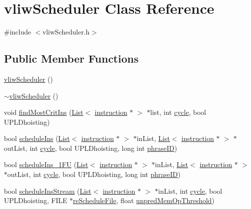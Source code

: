 \hypertarget{classvliwScheduler}{
\section{vliwScheduler Class Reference}
\label{classvliwScheduler}
}


{\ttfamily \#include $<$vliwScheduler.h$>$}

\subsection*{Public Member Functions}
\begin{DoxyCompactItemize}
\item 
\hyperlink{classvliwScheduler_a99727364e47615fde6a54426b135df7a}{vliwScheduler} ()
\item 
\hyperlink{classvliwScheduler_a845a2546d4f6eccf05a853c3f56f30d6}{$\sim$vliwScheduler} ()
\item 
void \hyperlink{classvliwScheduler_afa9961197e83bf8ac47cc7f15232b70c}{findMostCritIns} (\hyperlink{classList}{List}$<$ \hyperlink{classinstruction}{instruction} $\ast$ $>$ $\ast$list, int \hyperlink{vliwScheduler_8cpp_a1f4871d45089b039d95d3832dd123827}{cycle}, bool UPLDhoisting)
\item 
bool \hyperlink{classvliwScheduler_a29a8e438bea013f48b2cc7b3e672dfe6}{scheduleIns} (\hyperlink{classList}{List}$<$ \hyperlink{classinstruction}{instruction} $\ast$ $>$ $\ast$inList, \hyperlink{classList}{List}$<$ \hyperlink{classinstruction}{instruction} $\ast$ $>$ $\ast$outList, int \hyperlink{vliwScheduler_8cpp_a1f4871d45089b039d95d3832dd123827}{cycle}, bool UPLDhoisting, long int \hyperlink{bkEnd_8cpp_a3709ef01c299a1b84a1b023b9a44d4bc}{phraseID})
\item 
bool \hyperlink{classvliwScheduler_a6b42ca4f7436dc7dfac2848dabc10416}{scheduleIns\_\-1FU} (\hyperlink{classList}{List}$<$ \hyperlink{classinstruction}{instruction} $\ast$ $>$ $\ast$inList, \hyperlink{classList}{List}$<$ \hyperlink{classinstruction}{instruction} $\ast$ $>$ $\ast$outList, int \hyperlink{vliwScheduler_8cpp_a1f4871d45089b039d95d3832dd123827}{cycle}, bool UPLDhoisting, long int \hyperlink{bkEnd_8cpp_a3709ef01c299a1b84a1b023b9a44d4bc}{phraseID})
\item 
bool \hyperlink{classvliwScheduler_a0c1dd56c752aee739de1aa373fc16078}{scheduleInsStream} (\hyperlink{classList}{List}$<$ \hyperlink{classinstruction}{instruction} $\ast$ $>$ $\ast$inList, int \hyperlink{vliwScheduler_8cpp_a1f4871d45089b039d95d3832dd123827}{cycle}, bool UPLDhoisting, FILE $\ast$\hyperlink{bkEnd_8cpp_a0e5f51d6a6b1d82437b223b600c984c2}{reScheduleFile}, float \hyperlink{binaryTranslator_2dot_8cpp_a88cfebd9f1e296c291bf05c5a78a6177}{unpredMemOpThreshold})

\end{DoxyCompactItemize}
